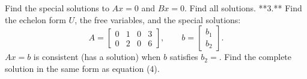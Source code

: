 Find the special solutions to \(Ax=0\) and \(Bx=0\). Find all solutions.
**3.** Find the echelon form \(U\), the free variables, and the special solutions: \[A=\begin{bmatrix}0&1&0&3\\ 0&2&0&6\end{bmatrix},\qquad b=\begin{bmatrix}b_{1}\\ b_{2}\end{bmatrix}.\] \(Ax=b\) is consistent (has a solution) when \(b\) satisfies \(b_{2}=\). Find the complete solution in the same form as equation (4).

 